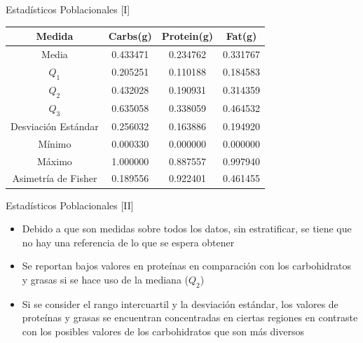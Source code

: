 \documentclass{beamer}
\begin{document}
    \begin{frame}{Estadísticos Poblacionales [I]}
        \begin{center}
            \begin{tabular}{|c|ccc|}
                \hline
                Medida & Carbs(g) & Protein(g) & Fat(g) \\
                \hline
                Media               & 0.433471 & 0.234762 & 0.331767 \\
                $Q_1$               & 0.205251 & 0.110188 & 0.184583 \\
                $Q_2$               & 0.432028 & 0.190931 & 0.314359 \\
                $Q_3$               & 0.635058 & 0.338059 & 0.464532 \\
                Desviación Estándar & 0.256032 & 0.163886 & 0.194920 \\
                Mínimo              & 0.000330 & 0.000000 & 0.000000 \\
                Máximo              & 1.000000 & 0.887557 & 0.997940 \\
                Asimetría de Fisher & 0.189556 & 0.922401 & 0.461455 \\
                \hline
            \end{tabular}
        \end{center}
    \end{frame}

    \begin{frame}{Estadísticos Poblacionales [II]}
        \begin{itemize}
            \item<1->Debido a que son medidas sobre todos 
            los datos, sin estratificar, se tiene que no 
            hay una referencia de lo que se espera obtener
            \item<2->Se reportan bajos valores en proteínas 
            en comparación con los carbohidratos y grasas 
            si se hace uso de la mediana ($Q_2$)
            \item<3->Si se consider el rango intercuartil y 
            la desviación estándar, los valores de proteínas y 
            grasas se encuentran concentradas en ciertas regiones 
            en contraste con los posibles valores de los carbohidratos 
            que son más diversos
        \end{itemize}
    \end{frame}
\end{document}
